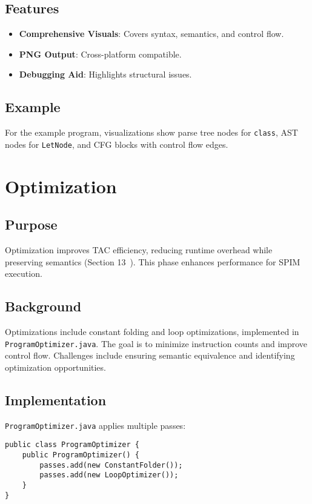 \documentclass[11pt, titlepage]{article}
\begin{document}
\subsection{Features}
\begin{itemize}[leftmargin=*]
    \item \textbf{Comprehensive Visuals}: Covers syntax, semantics, and control flow.
    \item \textbf{PNG Output}: Cross-platform compatible.
    \item \textbf{Debugging Aid}: Highlights structural issues.
\end{itemize}

\subsection{Example}
For the example program, visualizations show parse tree nodes for \texttt{class}, AST nodes for \texttt{LetNode}, and CFG blocks with control flow edges.

\section{Optimization}
\label{sec:optimization}

\subsection{Purpose}
Optimization improves TAC efficiency, reducing runtime overhead while preserving semantics (Section 13~\cite{cool_manual}). This phase enhances performance for SPIM execution.

\subsection{Background}
Optimizations include constant folding and loop optimizations, implemented in \texttt{ProgramOptimizer.java}. The goal is to minimize instruction counts and improve control flow. Challenges include ensuring semantic equivalence and identifying optimization opportunities.

\subsection{Implementation}
\texttt{ProgramOptimizer.java} applies multiple passes:

\begin{lstlisting}
public class ProgramOptimizer {
    public ProgramOptimizer() {
        passes.add(new ConstantFolder());
        passes.add(new LoopOptimizer());
    }
}
\end{lstlisting}
\end{document}
